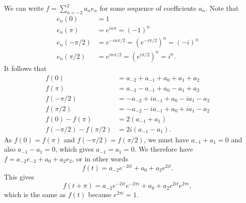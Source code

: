  We can write $f=\sum_{n=-2}^2a_ne_n$ for some sequence of
 coefficients $a_n$.  Note that
 \begin{align*}
  e_n(0) &= 1 \\
  e_n(\pi) &= e^{in\pi} = (-1)^n \\
  e_n(-\pi/2) &= e^{-in\pi/2} = (e^{-i\pi/2})^n = (-i)^n \\
  e_n(\pi/2) &= e^{in\pi/2} = (e^{i\pi/2})^n = i^n.
 \end{align*}
 It follows that
 \begin{align*}
  f(0)      &= a_{-2} + a_{-1} + a_0 + a_1 + a_2 \\
  f(\pi)    &= a_{-2} - a_{-1} + a_0 - a_1 + a_2 \\
  f(-\pi/2) &= -a_{-2} + ia_{-1} + a_0 - ia_1 - a_2 \\
  f(\pi/2)  &= -a_{-2} - ia_{-1} + a_0 + ia_1 - a_2 \\
  f(0)-f(\pi) &= 2(a_{-1}+a_1) \\
  f(-\pi/2)-f(\pi/2) &= 2i(a_{-1}-a_1).
 \end{align*}
 As $f(0)=f(\pi)$ and $f(-\pi/2)=f(\pi/2)$, we must have
 $a_{-1}+a_1=0$ and also $a_{-1}-a_1=0$, which gives $a_{-1}=a_1=0$.
 We therefore have $f=a_{-2}e_{-2}+a_0+a_2e_2$, or in other words
 \[ f(t) = a_{-2} e^{-2it} + a_0 + a_2 e^{2it}. \]
 This gives
 \[ f(t+\pi) =
  a_{-2} e^{-2it}e^{-2\pi i} + a_0 + a_2 e^{2it} e^{2\pi i},
 \]
 which is the same as $f(t)$ because $e^{2\pi i}=1$.
\EndDeferredSolution

